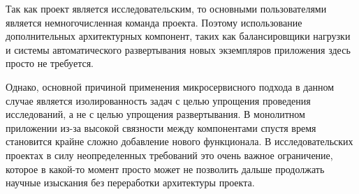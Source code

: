 Так как проект является исследовательским, то основными пользователями является немногочисленная команда проекта.
Поэтому использование дополнительных архитектурных компонент,
таких как балансировщики нагрузки и системы автоматического развертывания новых экземпляров приложения
здесь просто не требуется.

Однако, основной причиной применения микросервисного подхода в данном случае является изолированность задач с целью
упрощения проведения исследований, а не с целью упрощения развертывания.
В монолитном приложении из-за высокой связности между компонентами спустя время становится крайне сложно добавление
нового функционала. В исследовательских проектах в силу неопределенных требований это очень важное ограничение,
которое в какой-то момент просто может не позволить дальше продолжать
научные изыскания без переработки архитектуры проекта.
